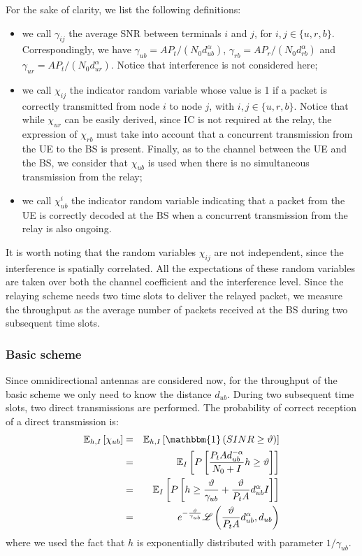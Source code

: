 \documentclass[12pt, letterpaper, onecolumn, draftcls]{IEEEtran}
\begin{document}
For the sake of clarity, we list the following definitions:
\begin{itemize}
 \item we call $\gamma_{ij}$ the average SNR between terminals $i$ and $j$, for $i,j\in\{u,r,b\}$. Correspondingly, we have $\gamma_{ub} = AP_t/(N_0d_{ub}^{\alpha})$, $\gamma_{rb} = AP_r/(N_0d_{rb}^{\alpha})$ and $\gamma_{ur} = AP_t/(N_0d_{ur}^{\alpha})$. Notice that interference is not considered here;
 \item we call $\chi_{ij}$ the indicator random variable whose value is 1 if a packet is correctly transmitted from node $i$ to node $j$, with $i,j\in\{u,r,b\}$. Notice that while $\chi_{ur}$ can be easily derived, since IC is not required at the relay, the expression of $\chi_{rb}$ must take into account that a concurrent transmission from the UE to the BS is present. Finally, as to the channel between the UE and the BS, we consider that $\chi_{ub}$ is used when there is no simultaneous transmission from the relay;
 \item we call $\chi_{ub}^i$ the indicator random variable indicating that a packet from the UE is correctly decoded at the BS when a concurrent transmission from the relay is also ongoing.
\end{itemize}
It is worth noting that the random variables $\chi_{ij}$ are not independent, since the interference is spatially correlated. All the expectations of these random variables are taken over both the channel coefficient and the interference level.
Since the relaying scheme needs two time slots to deliver the relayed packet, we measure the throughput as the average number of packets received at the BS during two subsequent time slots.


\subsubsection{Basic scheme}
Since omnidirectional antennas are considered now, for the throughput of the basic scheme we only need to know the distance $d_{ub}$. 
During two subsequent time slots, two direct transmissions are performed.
The probability of correct reception of a direct transmission is:
\begin{eqnarray}
 \mathbb{E}_{h,I}\left[\chi_{ub}\right] & = & \mathbb{E}_{h,I}\left[\mathbbm{1}\left(SINR \geq \vartheta\right)\right]\nonumber\\
 & = & \mathbb{E}_I\left[P\left[\frac{P_tAd_{ub}^{-\alpha}}{N_0+I}h \geq \vartheta\right]\right] \nonumber\\
 & = & \mathbb{E}_I\left[P\left[h\geq \frac{\vartheta}{\gamma_{ub}} + \frac{\vartheta}{P_tA}d_{ub}^{\alpha}I \right]\right] \nonumber\\
 & = & e^{-\frac{\vartheta}{\gamma_{ub}}}\mathscr{L}\left(\frac{\vartheta}{P_tA}d_{ub}^{\alpha},d_{ub}\right)
 \label{Throdir}
\end{eqnarray}
where we used the fact that $h$ is exponentially distributed with parameter $1/\gamma_{ub}$.
\end{document}
